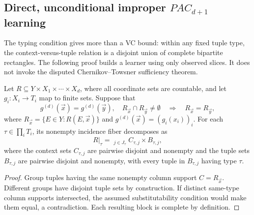 
\subsection{Direct, unconditional improper \(PAC_{d+1}\) learning}
\label{subsec:direct-improper-pac}

The typing condition gives more than a VC bound: within any fixed
tuple type, the context-versus-tuple relation is a disjoint union of
complete bipartite rectangles.  The following proof builds a learner
using only observed slices.  It does not invoke the disputed
Chernikov--Towsner sufficiency theorem.

\begin{lemma}
\label{lem:typed-rectangles}
Let \(R\subseteq Y\times X_1\times\cdots\times X_d\),
where all coordinate sets are countable, and let
\(g_i:X_i\to T_i\) map to finite sets.  Suppose that
\[
 g^{(d)}(\vec x)=g^{(d)}(\vec y),\quad
 R_{\vec x}\cap R_{\vec y}\ne\emptyset
 \quad\Longrightarrow\quad R_{\vec x}=R_{\vec y},
\]
where \(R_{\vec x}=\{E\in Y:R(E,\vec x)\}\) and
\(g^{(d)}(\vec x)=(g_i(x_i))_i\).
For each \(\tau\in\prod_iT_i\), its nonempty incidence fiber
decomposes as
\[
 R|_{\tau}=\mathop{\dot\bigcup}_{j\in J_\tau}
 C_{\tau,j}\times B_{\tau,j},
\]
where the context sets \(C_{\tau,j}\) are pairwise disjoint
and nonempty and the tuple sets \(B_{\tau,j}\) are pairwise
disjoint and nonempty, with every tuple in \(B_{\tau,j}\)
having type \(\tau\).
\end{lemma}
\begin{proof}
Group tuples having the same nonempty column support
\(C=R_{\vec x}\).  Different groups have disjoint tuple
sets by construction.  If distinct same-type column supports
intersected, the assumed substitutability condition would
make them equal, a contradiction.  Each resulting block
is complete by definition.
\end{proof}

